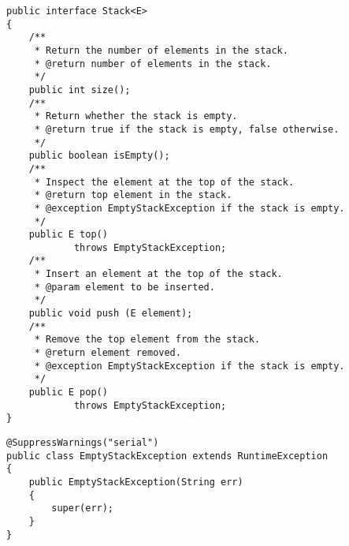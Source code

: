 \documentclass{article}
\begin{document}
\begin{lstlisting}
public interface Stack<E>
{
	/**
	 * Return the number of elements in the stack.
	 * @return number of elements in the stack. 
	 */
	public int size();
	/** 
	 * Return whether the stack is empty.
	 * @return true if the stack is empty, false otherwise. 
	 */
	public boolean isEmpty();
	/** 
	 * Inspect the element at the top of the stack.
	 * @return top element in the stack.  
	 * @exception EmptyStackException if the stack is empty. 
	 */
	public E top() 
			throws EmptyStackException;  
	/**
	 * Insert an element at the top of the stack.
	 * @param element to be inserted.
	 */
	public void push (E element); 
	/** 
	 * Remove the top element from the stack.
	 * @return element removed.
	 * @exception EmptyStackException if the stack is empty.
	 */
	public E pop()
			throws EmptyStackException;
}
\end{lstlisting}

\begin{lstlisting}
@SuppressWarnings("serial")
public class EmptyStackException extends RuntimeException
{  
	public EmptyStackException(String err)
	{
		super(err);
	}
}
\end{lstlisting}
\end{document}
